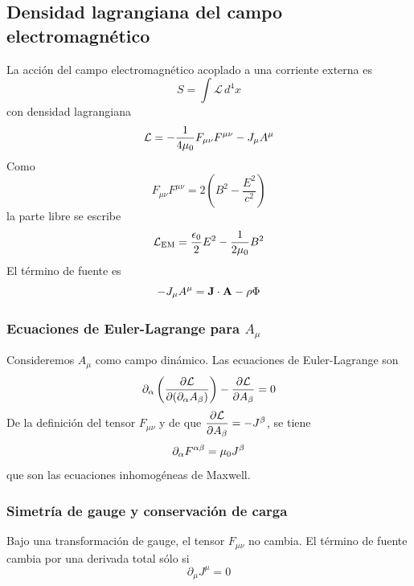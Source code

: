 \documentclass[]{article}
\numberwithin{equation}{section}
\begin{document}
\subsection{Densidad lagrangiana del campo electromagnético}
La acción del campo electromagnético acoplado a una corriente externa es
\begin{equation}
	S = \int\mathcal{L} \, d^4 x
\end{equation}
con densidad lagrangiana
\begin{equation}
	\mathcal{L} = - \frac{1}{4\mu_{0}} F_{\mu\nu} F^{\mu\nu} - J_\mu A^\mu
\end{equation}
Como
\begin{equation}
	F_{\mu\nu} F^{\mu\nu} = 2 \left(B^2 - \frac{E^2}{c^2}\right)
\end{equation}
la parte libre se escribe
\begin{equation}
	\mathcal{L}_\mathrm{EM} = \frac{\epsilon_{0}}{2} E^2 - \frac{1}{2\mu_{0}} B^2
\end{equation}
El término de fuente es
\begin{equation}
	- J_\mu A^\mu = \mathbf{J}\cdot\mathbf{A} - \rho\Phi
\end{equation}

\subsubsection{Ecuaciones de Euler-Lagrange para $A_\mu$}
Consideremos $A_\mu$ como campo dinámico. Las ecuaciones de Euler-Lagrange son
\begin{equation}
	\partial_\alpha \left(\dfrac{\partial \mathcal{L}}{\partial (\partial_\alpha A_\beta)}\right) - \dfrac{\partial \mathcal{L}}{\partial A_\beta} = 0
\end{equation}
De la definición del tensor $F_{\mu\nu}$ y de que $\dfrac{\partial \mathcal{L}}{\partial A_\beta} = -J^\beta$, se tiene
\begin{equation}
	\partial_\alpha F^{\alpha\beta} = \mu_{0} J^\beta
\end{equation}
que son las ecuaciones inhomogéneas de Maxwell.

\subsubsection{Simetría de gauge y conservación de carga}
Bajo una transformación de gauge, el tensor $F_{\mu\nu}$ no cambia. El término de fuente cambia por una derivada total sólo si
\begin{equation}
	\partial_\mu J^\mu = 0
\end{equation}
\end{document}
